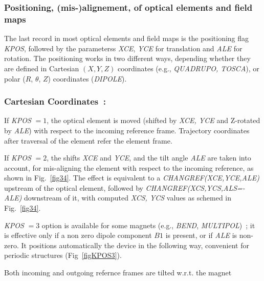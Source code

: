 



\subsubsection{Positioning, (mis-)alignement, 
of optical elements  and field maps} \label{sec4.6.2} 

The last record in most optical elements and field maps is the positioning flag 
\textsl{KPOS}, followed by the parameterss \textsl{XCE}, \textsl{YCE} 
for translation and \textsl{ALE} for rotation. The positioning works in two different ways, 
depending  whether they are defined in 
Cartesian $ (X, Y, Z) $ coordinates (e.g., \textsl{QUADRUPO, TOSCA}),
 or polar 
 ($R$, $\theta$, $Z$)  coordinates (\textsl{DIPOLE}). 
 
 \subsubsection*{Cartesian Coordinates~:} 
 
 If \textsl{KPOS} $ =1$, the optical element is moved (shifted by \textsl{XCE, YCE} and Z-rotated by 
\textsl{ALE}) with respect to the incoming reference frame. Trajectory coordinates after traversal of the 
element refer the element frame. 

\noindent If  \textsl{KPOS} $=2 $, the shifts   \textsl{XCE}   
and   \textsl{YCE}, and the tilt angle \textsl{ALE}   are taken into 
account, for mis-aligning  the element with respect to the incoming 
reference, as shown in Fig.~\ref{fig34}.  
The effect is equivalent to  a \textsl{CHANGREF(XCE,YCE,ALE)}  upstream of the 
optical element, followed by   \textsl{CHANGREF(XCS,YCS,ALS=-ALE)} downstream of it, with 
 computed \textsl{XCS, YCS} values as schemed in Fig.~\ref{fig34}.  

\noindent \textsl{KPOS} $=3 $ option is available for some 
 magnets  (e.g., \textsl{BEND}, \textsl{MULTIPOL})~; 
it is effective only if a non zero dipole component $B1$ is present, or if  \textsl{ALE} is non-zero. 
It positions automatically the 
device in the  following way, convenient for periodic structures (Fig~\ref{figKPOS3}).
 
Both incoming and outgoing refernce frames are  tilted w.r.t. the magnet 

